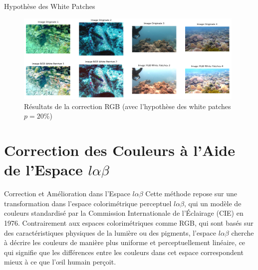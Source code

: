 \documentclass[8pt,a4paper]{beamer}
\numberwithin{figure}{section}
\begin{document}
\begin{frame}{Hypothèse des White Patches}
\begin{figure}[h!]
\begin{center}
\includegraphics[width=11cm]{image013.png}
\end{center}
\label{figure2.2}
\caption{Résultats de la correction RGB (avec l'hypothèse des white patches $p=20\%$)}
\end{figure}
\end{frame}

\section{Correction des Couleurs à l'Aide de l'Espace \( l\alpha\beta \)}
\frame{\tableofcontents[currentsection]}


\begin{frame}{Correction et Amélioration dans l'Espace \( l\alpha\beta \)}
Cette méthode repose sur une transformation dans l'espace colorimétrique perceptuel $l\alpha\beta$, qui un modèle de couleurs standardisé par la Commission Internationale de l'Éclairage (CIE) en 1976. Contrairement aux espaces colorimétriques comme RGB, qui sont basés sur des caractéristiques physiques de la lumière ou des pigments, l'espace $l\alpha\beta$ cherche à décrire les couleurs de manière plus uniforme et perceptuellement linéaire, ce qui signifie que les différences entre les couleurs dans cet espace correspondent mieux à ce que l'œil humain perçoit.
\end{frame}
\end{document}
